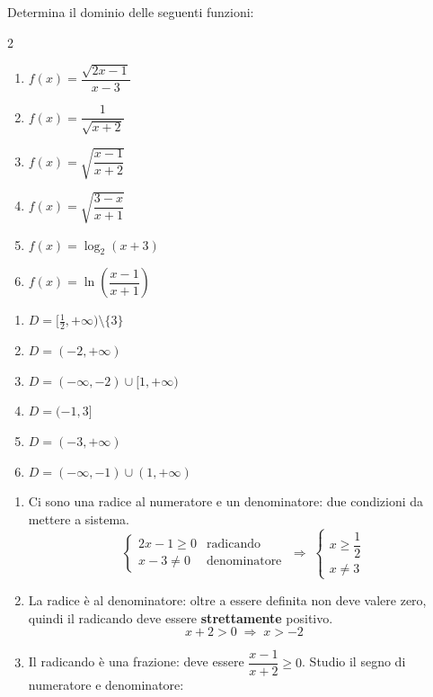 \begin{question}[ID=1.2, subtitle={Dominio di funzioni razionali e irrazionali}, difficulty=media, tags={funzioni, dominio}]
Determina il dominio delle seguenti funzioni:
\begin{multicols}{2}
\begin{enumerate}[leftmargin=3.2cm]
    \item $f(x)=\dfrac{\sqrt{2x-1}}{x-3}$
    \item $f(x)=\dfrac{1}{\sqrt{x+2}}$
    \item $f(x)=\sqrt{\dfrac{x-1}{x+2}}$
    \item $f(x)=\sqrt{\dfrac{3-x}{x+1}}$
    \item $f(x)=\log_2(x+3)$
    \item $f(x)=\ln\left(\dfrac{x-1}{x+1}\right)$
\end{enumerate}
\end{multicols}
\begin{solution}
\begin{enumerate}
    \item $D=[\tfrac12,+\infty)\setminus\{3\}$
    \item $D=(-2,+\infty)$
    \item $D=(-\infty,-2)\cup[1,+\infty)$
    \item $D=(-1,3]$
    \item $D=(-3,+\infty)$
    \item $D=(-\infty,-1)\cup(1,+\infty)$
\end{enumerate}
\end{solution}
\begin{explanation}
\begin{enumerate}
    \item Ci sono una radice al numeratore e un denominatore: due condizioni da mettere a sistema.
    \[ \begin{cases} 2x-1\geq 0 & \text{radicando}\\ x-3\neq 0 & \text{denominatore}\end{cases} \;\Rightarrow\; \begin{cases} x\geq\dfrac12\\ x\neq 3\end{cases} \]
    \item La radice è al denominatore: oltre a essere definita non deve valere zero, quindi il radicando deve essere \textbf{strettamente} positivo.
    \[ x+2>0 \;\Rightarrow\; x>-2 \]
    \item Il radicando è una frazione: deve essere $\dfrac{x-1}{x+2}\geq 0$. Studio il segno di numeratore e denominatore:

\end{enumerate}
\end{explanation}
\end{question}
